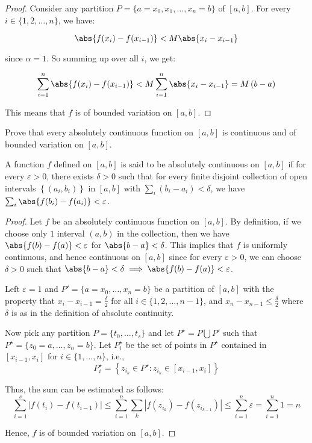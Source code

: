 \documentclass{article}
\begin{document}
\begin{proof}
    Consider any partition \( P = \{a = x_0, x_1, \ldots, x_n = b\} \) of \( [a, b] \). For every \( i \in \{1, 2, \ldots, n\} \), we have:

    \[
    \abs{f(x_i) - f(x_{i-1})} < M \abs{x_i - x_{i-1}}
    \]

    since $\alpha = 1$. So summing up over all \( i \), we get:

    \[
    \sum_{i=1}^{n} \abs{f(x_i) - f(x_{i-1})} < M \sum_{i=1}^{n} \abs{x_i - x_{i-1}} = M\left(b - a\right)
    \]

    This means that \( f \) is of bounded variation on \( [a, b] \).

\end{proof}

\clearpage

\begin{question*}[6.11]
    Prove that every absolutely continuous function on $\left[a, b\right]$ is continuous and of bounded variation on $\left[a, b\right]$.
\end{question*}

\begin{definition*}
    A function $f$ defined on $\left[a, b\right]$ is said to be absolutely continuous on $\left[a, b\right]$ if for every $\varepsilon > 0$, there exists $\delta > 0$ such that for every finite disjoint collection of open intervals $\left\{ (a_i, b_i) \right\}$ in $\left[a, b\right]$ with $\sum_i (b_i - a_i) < \delta$, we have $\sum_i \abs{f(b_i) - f(a_i)} < \varepsilon$.
\end{definition*}

\begin{proof}
    Let $f$ be an absolutely continuous function on $\left[a, b\right]$. By definition, if we choose only $1$ interval $(a, b)$ in the collection, then we have $\abs{f(b) - f(a)} < \varepsilon$ for $\abs{b - a} < \delta$. This implies that $f$ is uniformly continuous, and hence continuous on $\left[a, b\right]$ since for every $\varepsilon > 0$, we can choose $\delta > 0$ such that $\abs{b - a} < \delta \implies \abs{f(b) - f(a)} < \varepsilon$.

    Left \(\varepsilon = 1\) and \( P' = \{a = x_0, \ldots, x_n = b\} \) be a partition of \([a,b]\) with the property that \( x_i - x_{i-1} = \frac{\delta}{2} \) for all \( i \in \{1, 2, \ldots, n-1\} \), and \( x_n - x_{n-1} \leq \frac{\delta}{2} \) where $\delta$ is as in the definition of absolute continuity.

    Now pick any partition \( P = \{t_0,\ldots,t_s\} \) and let \( P^{\star} = P \bigcup P' \) such that \( P^{\star} = \{z_0 = a, \ldots, z_n = b\} \). Let \( P^{\star}_i \) be the set of points in \( P^{\star} \) contained in \([x_{i-1}, x_i]\) for \( i \in \{1,\ldots,n\} \), i.e.,
    \[
    P^{\star}_i = \left\{ z_{i_k} \in P^{\star} : z_{i_k} \in [x_{i-1}, x_i] \right\}
    \]

    Thus, the sum can be estimated as follows:
    \[
    \sum_{i=1}^s |f(t_i) - f(t_{i-1})| \leq \sum_{i=1}^{n} \sum_{k} |f(z_{i_k}) - f(z_{i_{k-1}})| \leq \sum_{i = 1}^{n} \varepsilon = \sum_{i = 1}^{n} 1 = n
    \]

    Hence, \( f \) is of bounded variation on \([a,b]\).
\end{proof}
\end{document}
